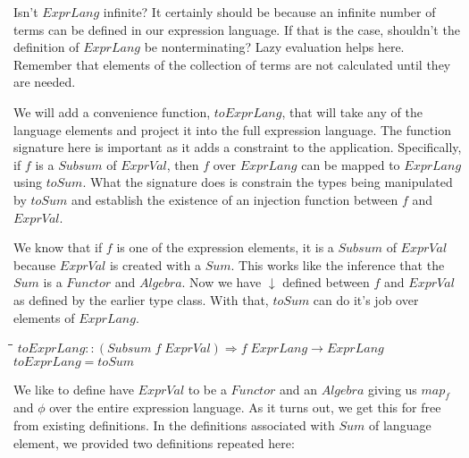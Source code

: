 \documentclass[11pt]{article}
\newlength{\lwidth}\setlength{\lwidth}{4.5cm}
\newlength{\cwidth}\setlength{\cwidth}{8mm} %
\newcommand{\Conid}[1]{\mathit{#1}}
\newcommand{\Varid}[1]{\mathit{#1}}
\begin{document}
Isn't \ensuremath{\Conid{ExprLang}} infinite?  It certainly should be because an infinite
number of terms can be defined in our expression language.  If that is
the case, shouldn't the definition of \ensuremath{\Conid{ExprLang}} be nonterminating?
Lazy evaluation helps here.  Remember that elements of the collection
of terms are not calculated until they are needed.

We will add a convenience function, \ensuremath{\Varid{toExprLang}}, that will take any
of the language elements and project it into the full expression
language.  The function signature here is important as it adds a
constraint to the application.  Specifically, if \ensuremath{\Varid{f}} is a \ensuremath{\Conid{Subsum}} of
\ensuremath{\Conid{ExprVal}}, then \ensuremath{\Varid{f}} over \ensuremath{\Conid{ExprLang}} can be mapped to \ensuremath{\Conid{ExprLang}} using
\ensuremath{\Varid{toSum}}.  What the signature does is constrain the types being
manipulated by \ensuremath{\Varid{toSum}} and establish the existence of an injection
function between \ensuremath{\Varid{f}} and \ensuremath{\Conid{ExprVal}}.

We know that if \ensuremath{\Varid{f}} is one of the expression elements, it is a
\ensuremath{\Conid{Subsum}} of \ensuremath{\Conid{ExprVal}} because \ensuremath{\Conid{ExprVal}} is created with a \ensuremath{\Conid{Sum}}.  This
works like the inference that the \ensuremath{\Conid{Sum}} is a \ensuremath{\Conid{Functor}} and \ensuremath{\Conid{Algebra}}.
Now we have \ensuremath{\Varid{\downarrow}} defined between \ensuremath{\Varid{f}} and \ensuremath{\Conid{ExprVal}} as defined by the
earlier type class.  With that, \ensuremath{\Varid{toSum}} can do it's job over elements
of \ensuremath{\Conid{ExprLang}}.

\begin{tabbing}
\qquad\=\hspace{\lwidth}\=\hspace{\cwidth}\=\+\kill
${\Varid{toExprLang}\mathbin{::}(\Conid{Subsum}\;\Varid{f}\;\Conid{ExprVal})\Rightarrow \Varid{f}\;\Conid{ExprLang}\to \Conid{ExprLang}}$\\
${\Varid{toExprLang}\mathrel{=}\Varid{toSum}}$
\end{tabbing}
We like to define have \ensuremath{\Conid{ExprVal}} to be a \ensuremath{\Conid{Functor}} and an \ensuremath{\Conid{Algebra}}
giving us \ensuremath{\Varid{map}_{f}} and \ensuremath{\Varid{\phi}} over the entire expression language.  As it
turns out, we get this for free from existing definitions.  In the
definitions associated with \ensuremath{\Conid{Sum}} of language element, we provided two
definitions repeated here:
\end{document}
